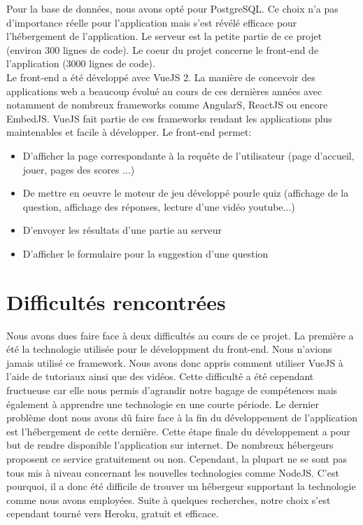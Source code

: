 \documentclass[a4paper,11pt, oneside]{book}
\begin{document}
\noindent Pour la base de données, nous avons opté pour PostgreSQL. Ce choix n'a pas d'importance réelle pour l'application mais s'est révélé efficace pour l'hébergement de l'application.
Le serveur est la petite partie de ce projet (environ 300 lignes de code). Le coeur du projet concerne le front-end de l'application (3000 lignes de code).\\

Le front-end a été développé avec VueJS 2. La manière de concevoir des applications web a beaucoup évolué au cours de ces dernières années avec notamment de nombreux frameworks comme AngularS, ReactJS ou encore EmbedJS. VueJS fait partie
de ces frameworks rendant les applications plus maintenables et facile à développer. Le front-end permet:
\begin{itemize}
		\item D'afficher la page correspondante à la requête de l'utilisateur (page d'accueil, jouer, pages des scores ...)
		\item De mettre en oeuvre le moteur de jeu développé pourle quiz (affichage de la question, affichage des réponses, lecture d'une vidéo youtube...)
		\item D'envoyer les résultats d'une partie au serveur
		\item D'afficher le formulaire pour la suggestion d'une question
\end{itemize}


\section{Difficultés rencontrées}

Nous avons dues faire face à deux difficultés au cours de ce projet. La première a été la technologie utilisée pour le développment du front-end. Nous n'avions jamais utilisé ce framework.
Nous avons donc appris comment utiliser VueJS à l'aide de tutoriaux ainsi que des vidéos. Cette difficulté a été cependant fructueuse car elle nous permis d'agrandir notre bagage de compétences
mais également à apprendre une technologie en une courte période.
Le dernier problème dont nous avons dû faire face à la fin du développement de l'application est l'hébergement de cette dernière. Cette étape finale du développement a pour but de
rendre disponible l'application sur internet. De nombreux hébergeurs proposent ce service gratuitement ou non. Cependant, la plupart ne se sont pas tous mis à niveau concernant
les nouvelles technologies comme NodeJS. C'est pourquoi, il a donc été difficile de trouver un hébergeur supportant la technologie comme nous avons employées. Suite à quelques recherches, notre choix s'est cependant tourné vers Heroku,
gratuit et efficace.\\
\end{document}
